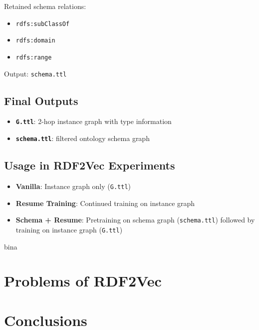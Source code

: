 \documentclass[a4paper,oneside,bibliography=totoc]{scrartcl}
\begin{document}
Retained schema relations:
\begin{itemize}
    \item \texttt{rdfs:subClassOf}
    \item \texttt{rdfs:domain}
    \item \texttt{rdfs:range}
\end{itemize}

\noindent Output: \texttt{schema.ttl}

\subsection{Final Outputs}

\begin{itemize}
    \item \textbf{\texttt{G.ttl}}: 2-hop instance graph with type information
    \item \textbf{\texttt{schema.ttl}}: filtered ontology schema graph
\end{itemize}

\subsection{Usage in RDF2Vec Experiments}

\begin{itemize}
    \item \textbf{Vanilla}: Instance graph only (\texttt{G.ttl})
    \item \textbf{Resume Training}: Continued training on instance graph
    \item \textbf{Schema + Resume}: Pretraining on schema graph (\texttt{schema.ttl}) followed by training on instance graph (\texttt{G.ttl})
\end{itemize}



% 
% 
bina

\section{Problems of RDF2Vec}



\section{Conclusions}

\end{document}
